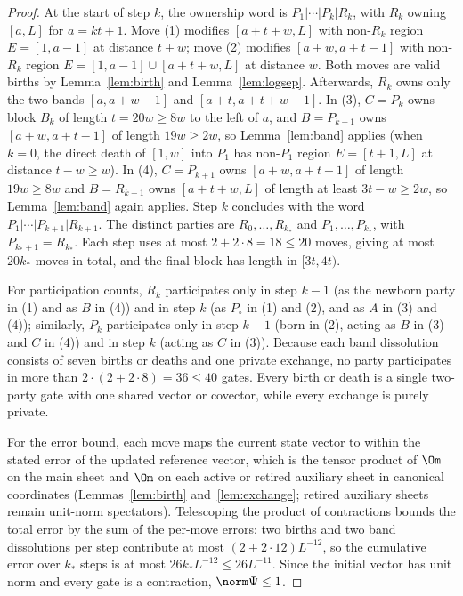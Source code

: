 \begin{proof}
At the start of step $k$, the ownership word is $P_1|\cdots|P_k|R_k$, with $R_k$ owning
$[a,L]$ for $a=kt+1$. Move (1) modifies $[a+t+w,L]$ with non-$R_k$ region
$E=[1,a-1]$ at distance $t+w$; move (2) modifies $[a+w,a+t-1]$ with non-$R_k$ region
$E=[1,a-1]\cup[a+t+w,L]$ at distance $w$. Both moves are valid births by
Lemma~\ref{lem:birth} and Lemma~\ref{lem:logsep}. Afterwards, $R_k$ owns
only the two bands $[a,a+w-1]$ and $[a+t,a+t+w-1]$. In (3), $C=P_k$ owns
block $B_k$ of length $t=20w\ge8w$ to the left of $a$, and $B=P_{k+1}$ owns
$[a+w,a+t-1]$ of length $19w\ge2w$, so Lemma~\ref{lem:band} applies
(when $k=0$, the direct death of $[1,w]$ into $P_1$ has non-$P_1$ region $E=[t+1,L]$ at distance
$t-w\ge w$). In (4), $C=P_{k+1}$ owns $[a+w,a+t-1]$ of length $19w\ge8w$ and
$B=R_{k+1}$ owns $[a+t+w,L]$ of length at least $3t-w\ge2w$, so Lemma~\ref{lem:band} again applies. Step $k$ concludes with
the word $P_1|\cdots|P_{k+1}|R_{k+1}$. The distinct parties are $R_0,\dots,R_{k_*}$
and $P_1,\dots,P_{k_*}$, with $P_{k_*+1}=R_{k_*}$. Each step uses at most $2+2\cdot8=18\le20$ moves, giving at most $20k_*$ moves in total, and the final
block has length in $[3t,4t)$.

For participation counts, $R_k$ participates only in step $k-1$ (as the newborn party in (1)
and as $B$ in (4)) and in step $k$ (as $P_\circ$ in (1) and (2), and as $A$ in (3) and
(4)); similarly, $P_k$ participates only in step $k-1$ (born in (2), acting as $B$ in (3) and $C$ in (4))
and in step $k$ (acting as $C$ in (3)). Because each band dissolution consists of seven births or deaths and one
private exchange, no party participates in more than $2\cdot(2+2\cdot8)=36\le40$ gates.
Every birth or death is a single two-party gate with one shared
vector or covector, while every exchange is purely private.

For the error bound, each move maps the current state vector to within the stated
error of the updated reference vector, which is the tensor product of $\Om$
on the main sheet and $\Om$ on each active or retired auxiliary sheet in canonical
coordinates (Lemmas~\ref{lem:birth} and~\ref{lem:exchange}; retired auxiliary sheets
remain unit-norm spectators). Telescoping the product of contractions bounds
the total error by the sum of the per-move errors: two births and
two band dissolutions per step contribute at most $(2+2\cdot12)L^{-12}$, so the cumulative error over $k_*$ steps
is at most $26k_*L^{-12}\le 26L^{-11}$. Since the initial vector has unit norm and every gate is a
contraction, $\norm\Psi\le1$.
\end{proof}

